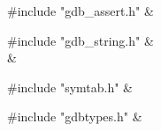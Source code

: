 \medskip
\begin{cxreftabi}
{\stt \#include "gdb\_assert.h"} &\\
\end{cxreftabi}

\medskip
\begin{cxreftabi}
{\stt \#include "gdb\_string.h"} &\\
\hspace*{0.2in}{\stt \#include <string.h>} &\\
\end{cxreftabi}

\medskip
\begin{cxreftabi}
{\stt \#include "symtab.h"} &\\
\end{cxreftabi}

\medskip
\begin{cxreftabi}
{\stt \#include "gdbtypes.h"} &\\
\end{cxreftabi}

